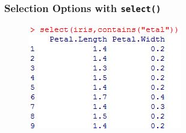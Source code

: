 \documentclass{beamer}
\begin{document}
	
	\begin{frame}
		\frametitle{Selection Options with \texttt{select()}}
		
		\begin{figure}
			\centering
			\includegraphics[width=0.69\linewidth]{images/selectioncontaints}
		\end{figure}
		
	\end{frame}
		
\end{document}
